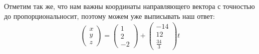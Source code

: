 \documentclass[a4paper,11pt]{article}
\begin{document}
Отметим так же, что нам важны координаты направляющего вектора с точностью до пропорциональносит, поэтому можем уже выписывать наш ответ:
\begin{gather*}
\begin{pmatrix}
x \\
y \\
z 
\end{pmatrix}
= 
\begin{pmatrix}
1 \\
2 \\
-2 
\end{pmatrix}
+ 
\begin{pmatrix}
-14 \\
12 \\
\frac{34}3
\end{pmatrix}
t
\end{gather*}
\newpage








\end{document}
